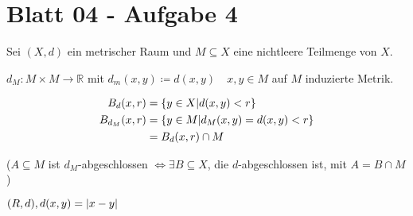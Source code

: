 \documentclass{scrreprt}
\begin{document}
\section{Blatt 04 - Aufgabe 4}

Sei $(X, d)$ ein metrischer Raum und $M \subseteq X$ eine nichtleere Teilmenge von $X$.

$d_M \colon M \times M \to \mathbb{R}$ mit $d_m(x, y) \coloneqq d(x, y) \quad x, y \in M$
auf $M$ induzierte Metrik.

\begin{align*}
  B_d(x, r) &= \qty{ y \in X \middle| d(x, y) < r } \\
  B_{d_M}(x, r) &= \qty{ y \in M \middle| d_M(x, y) = d(x, y) < r } \\
            &= B_d(x, r) \cap M
\end{align*}

($A \subseteq M$ ist $d_M$-abgeschlossen $\iff \exists B \subseteq X$, die $d$-abgeschlossen ist, mit $A = B \cap M$)

$(R, d), d(x, y) = \abs{x - y}$
\end{document}

